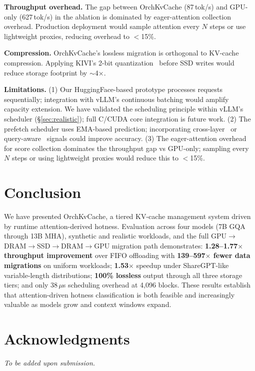 \documentclass[conference]{IEEEtran}
\begin{document}
\textbf{Throughput overhead.} The gap between OrchKvCache (87\,tok/s) and GPU-only (627\,tok/s) in the ablation is dominated by eager-attention collection overhead. Production deployment would sample attention every $N$ steps or use lightweight proxies, reducing overhead to $<$15\%.

\textbf{Compression.} OrchKvCache's lossless migration is orthogonal to KV-cache compression. Applying KIVI's 2-bit quantization~\cite{kivi} before SSD writes would reduce storage footprint by ${\sim}$4$\times$.

\textbf{Limitations.} (1) Our HuggingFace-based prototype processes requests sequentially; integration with vLLM's continuous batching would amplify capacity extension. We have validated the scheduling principle within vLLM's scheduler (\S\ref{sec:realistic}); full C/CUDA core integration is future work. (2) The prefetch scheduler uses EMA-based prediction; incorporating cross-layer~\cite{infinigen} or query-aware~\cite{quest} signals could improve accuracy. (3) The eager-attention overhead for score collection dominates the throughput gap vs GPU-only; sampling every $N$ steps or using lightweight proxies would reduce this to $<$15\%.

\section{Conclusion}

We have presented OrchKvCache, a tiered KV-cache management system driven by runtime attention-derived hotness. Evaluation across four models (7B GQA through 13B MHA), synthetic and realistic workloads, and the full GPU$\to$DRAM$\to$SSD$\to$DRAM$\to$GPU migration path demonstrates: \textbf{1.28--1.77$\times$ throughput improvement} over FIFO offloading with \textbf{139--597$\times$ fewer data migrations} on uniform workloads; \textbf{1.53$\times$} speedup under ShareGPT-like variable-length distributions; \textbf{100\% lossless} output through all three storage tiers; and only 38\,$\mu$s scheduling overhead at 4,096 blocks. These results establish that attention-driven hotness classification is both feasible and increasingly valuable as models grow and context windows expand.

\section*{Acknowledgments}
\textit{To be added upon submission.}
\end{document}
